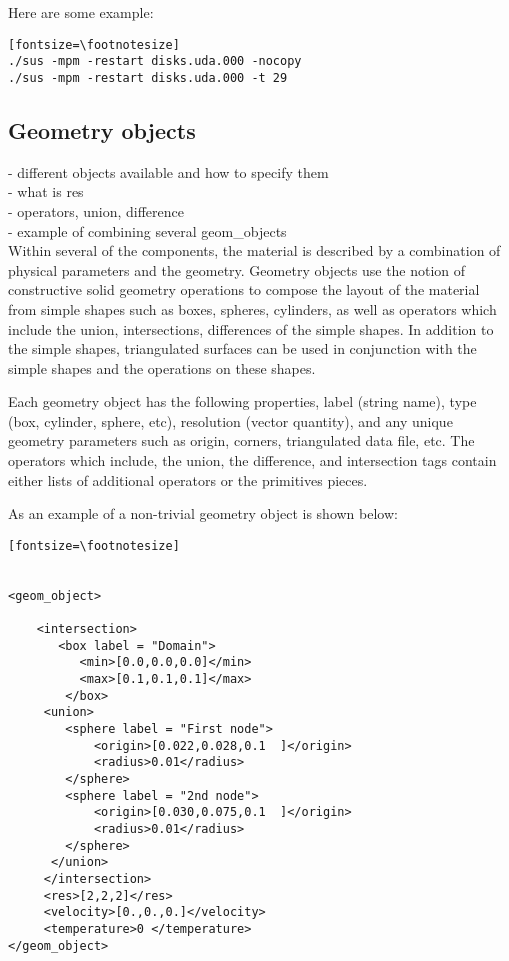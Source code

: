 Here are some example:

\begin{verbatim}[fontsize=\footnotesize]
./sus -mpm -restart disks.uda.000 -nocopy
./sus -mpm -restart disks.uda.000 -t 29
\end{verbatim}
%
\subsection{Geometry objects} \label{Sec:GeometryObjects}
- different objects available and how to specify them\\
- what is res \\
- operators, union, difference\\
- example of combining several geom\_objects\\

Within several of the components, the material is described by a
combination of physical parameters and the geometry.  Geometry objects
use the notion of constructive solid geometry operations to compose
the layout of the material from simple shapes such as boxes, spheres,
cylinders, as well as operators which include the union,
intersections, differences of the simple shapes.  In addition to the
simple shapes, triangulated surfaces can be used in conjunction with
the simple shapes and the operations on these shapes.

Each geometry object has the following properties, label (string
name), type (box, cylinder, sphere, etc), resolution (vector
quantity), and any unique geometry parameters such as origin, corners,
triangulated data file, etc.  The operators which include, the union,
the difference, and intersection tags contain either lists of
additional operators or the primitives pieces.


As an example of a non-trivial geometry object is shown below:

\begin{verbatim}[fontsize=\footnotesize]


<geom_object>

    <intersection>
       <box label = "Domain">
          <min>[0.0,0.0,0.0]</min>
          <max>[0.1,0.1,0.1]</max>
        </box>
     <union>
        <sphere label = "First node">
            <origin>[0.022,0.028,0.1  ]</origin>
            <radius>0.01</radius>
        </sphere>
        <sphere label = "2nd node">
            <origin>[0.030,0.075,0.1  ]</origin>
            <radius>0.01</radius>
        </sphere>
      </union>
     </intersection>
     <res>[2,2,2]</res>
     <velocity>[0.,0.,0.]</velocity>
     <temperature>0 </temperature>
</geom_object>

\end{verbatim}

